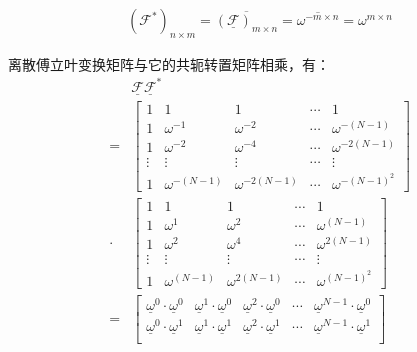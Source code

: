 \begin{align*}
	(\mathcal{F}^{*})_{n\times m} = \overline{(\underline{\mathcal{F}})_{m\times n}} = \overline{\omega^{-m\times n}} = \omega^{m\times n}
\end{align*}

离散傅立叶变换矩阵与它的共轭转置矩阵相乘，有：
\begin{align*}
	      & \underline{\mathcal{F}}\underline{\mathcal{F}}^{*}                                                                           \\
	=     & \begin{bmatrix} 1      & 1               & 1                & \cdots & 1                 \\
		1      & \omega^{-1}     & \omega^{-2}      & \cdots & \omega^{-(N-1)}   \\
		1      & \omega^{-2}     & \omega^{-4}      & \cdots & \omega^{-2(N-1)}  \\
		\vdots & \vdots          & \vdots           & \cdots & \vdots            \\
		1      & \omega^{-(N-1)} & \omega^{-2(N-1)} & \cdots & \omega^{-(N-1)^2}\end{bmatrix}                                                                                                   \\
	\cdot & \begin{bmatrix}
		1      & 1              & 1               & \cdots & 1                \\
		1      & \omega^{1}     & \omega^{2}      & \cdots & \omega^{(N-1)}   \\
		1      & \omega^{2}     & \omega^{4}      & \cdots & \omega^{2(N-1)}  \\
		\vdots & \vdots         & \vdots          & \cdots & \vdots           \\
		1      & \omega^{(N-1)} & \omega^{2(N-1)} & \cdots & \omega^{(N-1)^2}\end{bmatrix}
	\\
	=     & \begin{bmatrix}
		\underline{\omega}^0\cdot\underline{\omega}^0     & \underline{\omega}^1\cdot\underline{\omega}^0     & \underline{\omega}^2\cdot\underline{\omega}^0     & \cdots & \underline{\omega}^{N-1}\cdot\underline{\omega}^0     \\
		\underline{\omega}^0\cdot\underline{\omega}^1     & \underline{\omega}^1\cdot\underline{\omega}^1     & \underline{\omega}^2\cdot\underline{\omega}^1     & \cdots & \underline{\omega}^{N-1}\cdot\underline{\omega}^1     \\

\end{bmatrix}
\end{align*}
